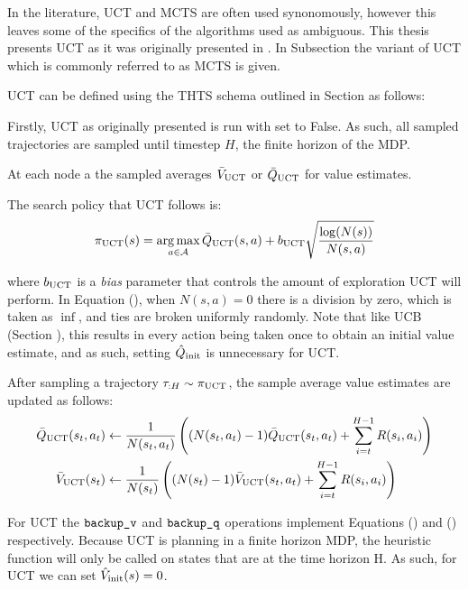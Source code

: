         In the literature, UCT and MCTS are often used synonomously, however this leaves some of the specifics of the algorithms used as ambiguous. This thesis presents UCT as it was originally presented in . In Subsection  the variant of UCT which is commonly referred to as MCTS is given.

        UCT can be defined using the THTS schema outlined in Section  as follows:

        Firstly, UCT as originally presented is run with \mctsmode set to False. As such, all sampled trajectories are sampled until timestep $H$, the finite horizon of the MDP. 

        At each node a the sampled averages ${\bar{V}_{{\textnormal{UCT}}}}$ or ${\bar{Q}_{{\textnormal{UCT}}}}$ for value estimates.

        The search policy that UCT follows is:
        \begin{align}
            {\pi_{{\textnormal{UCT}}}}(s) = \operatorname*{arg\,max}_{a\in\mathcal{A}} {\bar{Q}_{{\textnormal{UCT}}}}(s,a) + b_{{\textnormal{UCT}}} \sqrt{\frac{\log(N(s))}{N(s,a)}} \label{eq:uct_policy}
        \end{align}

        where $b_{{\textnormal{UCT}}}$ is a \textit{bias} parameter that controls the amount of exploration UCT will perform. In Equation (), when $N(s,a)=0$ there is a division by zero, which is taken as $\inf$, and ties are broken uniformly randomly. Note that like UCB (Section ), this results in every action being taken once to obtain an initial value estimate, and as such, setting ${\hat{Q}_{\textnormal{init}}}$ is unnecessary for UCT.   

        After sampling a trajectory $\tau_{:H}\sim\pi_{{\textnormal{UCT}}}$, the sample average value estimates are updated as follows:
        \begin{align}
            {\bar{Q}_{{\textnormal{UCT}}}}(s_t,a_t) &\leftarrow 
                \frac{1}{N(s_t,a_t)} \left( (N(s_t,a_t)-1) {\bar{Q}_{{\textnormal{UCT}}}}(s_t,a_t) 
                    + \sum_{i=t}^{H-1} R(s_i,a_i) \right) \\
            {\bar{V}_{{\textnormal{UCT}}}}(s_t) &\leftarrow 
                \frac{1}{N(s_t)} \left( (N(s_t)-1) {\bar{V}_{{\textnormal{UCT}}}}(s_t,a_t) 
                    + \sum_{i=t}^{H-1} R(s_i,a_i) \right) 
        \end{align}  

        For UCT the ${\textnormal{\texttt{backup\_v}}}$ and ${\textnormal{\texttt{backup\_q}}}$ operations implement Equations () and () respectively. Because UCT is planning in a finite horizon MDP, the heuristic function will only be called on states that are at the time horizon H. As such, for UCT we can set ${\hat{V}_{\textnormal{init}}}(s) = 0$. 






